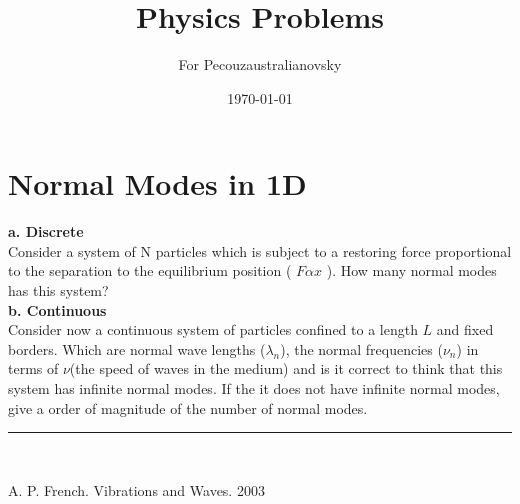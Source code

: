 \documentclass{article}
\begin{document}
\title{Physics Problems} %



\author{ For Pecouzaustralianovsky} %

\date{\today}
\maketitle







\section{Normal Modes in 1D}

\textbf{a. Discrete}\\

Consider a system of N particles which is subject to a restoring force proportional to the separation to the equilibrium position ( $ F \alpha x $ ). How many normal modes has this system?\\

\textbf{b. Continuous }\\

Consider now a continuous system of particles confined to a length $L$ and fixed borders. Which are normal wave lengths ($\lambda_n$), the normal frequencies  ($\nu_n$) in terms of $\nu$(the speed of waves in the medium) and is it correct to think that this system has infinite normal modes. If the it does not have infinite normal modes, give a order of magnitude of the number of normal modes.

\vspace{2mm}

\begin{center}
         \noindent\rule{8cm}{0.4pt}\\

\end{center}

\noindent [1] A. P. French. Vibrations and Waves. 2003
\end{document}
